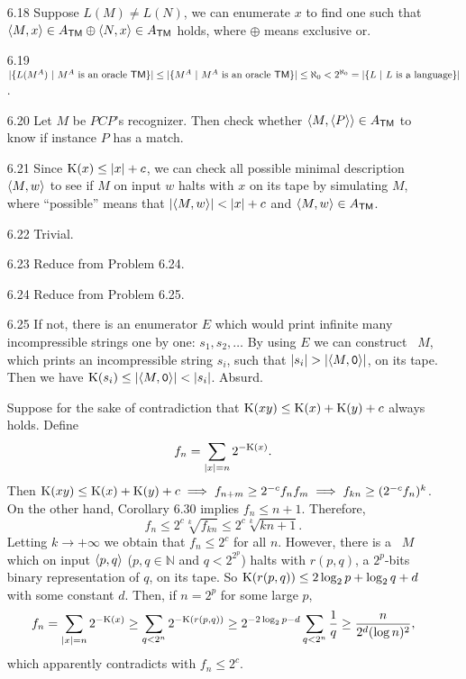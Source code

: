 \begin{itemize}
	\item[6.18]
	Suppose $L(M) \neq L(N)$, we can enumerate $x$ to find one such that $\Bra{M, x} \in A_{\TM} \oplus \Bra{N, x} \in A_{\TM}$ holds, where $\oplus$ means exclusive or.
	
	\item[6.19]
	$ |\{ L(M^A) \ | \ \text{$M^A$ is an oracle \TM} \}| \leq |\{ M^A \ | \ \text{$M^A$ is an oracle \TM} \}| \leq \aleph_0 < 2^{\aleph_0} = |\{ L \ | \ \text{$L$ is a language} \}|$.
	
	\item[6.20]
	Let $M$ be $PCP$'s recognizer. Then check whether $\Bra{M, \Bra{P}} \in A_{\TM}$ to know if instance $P$ has a match.
	
	\item[6.21]
	Since $\K(x) \leq |x| + c$, we can check all possible minimal description $\Bra{M, w}$ to see if $M$ on input $w$ halts with $x$ on its tape by simulating $M$, where ``possible'' means that $|\Bra{M, w}| < |x| + c$ and $\Bra{M, w} \in A_{\TM}$.
	
	\item[6.22]
	Trivial.
	
	\item[6.23]
	Reduce from Problem 6.24.
	
	\item[6.24]
	Reduce from Problem 6.25.
	
	\item[6.25]
	If not, there is an enumerator $E$ which would print infinite many incompressible strings one by one: $s_1, s_2, \dots$ By using $E$ we can construct \TM\ $M$, which prints an incompressible string $s_i$, such that $|s_i| > |\Bra{M, \TT{0}}|$, on its tape. Then we have $\K(s_i) \leq |\Bra{M, \TT{0}}| < |s_i|$. Absurd.
	
	\item[\Star 6.26] 
	Suppose for the sake of contradiction that $\K(xy) \leq \K(x) + \K(y) + c$ always holds. Define
	$$
		f_n = \sum_{|x|=n} {2^{-\K(x)}}.
	$$
	Then $\K(xy) \leq \K(x) + \K(y) + c \implies f_{n+m} \geq 2^{-c} f_n f_m \implies f_{k n} \geq (2^{-c} f_n)^{k}$. On the other hand, Corollary 6.30 implies $f_n \leq n + 1$. Therefore, 
	$$
		f_n \leq 2^c \sqrt[k]{f_{k n}} \leq 2^c \sqrt[k]{kn + 1}.
	$$
	Letting $k \to +\infty$ we obtain that $f_n \leq 2^c$ for all $n$. However, there is a \TM\ $M$ which on input $\Bra{p, q}$ ($p, q \in \mathbb{N}$ and $q < 2^{2^p}$) halts with $r(p,q)$, a $2^p$-bits binary representation of $q$, on its tape. So $\K(r(p,q)) \leq 2 \log_2 p + \log_2 q + d$ with some constant $d$. Then, if $n = 2^p$ for some large $p$,
	$$
		f_{n} = \sum_{|x|=n} {2^{-\K(x)}} \geq \sum_{q < 2^n} {2^{-\K(r(p,q))}} \geq 2^{-2 \log_2 p - d} \sum_{q < 2^n} \frac{1}{q} \geq \frac{n}{2^d (\log n)^2},
	$$
	which apparently contradicts with $f_n \leq 2^c$.
	

\end{itemize}
